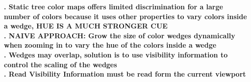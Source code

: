 \documentclass[review,journal]{vgtc}         %
\begin{document}
\textbf{. Static tree color maps offers limited discrimination for a large number of colors because it uses other properties to vary colors inside a wedge, HUE IS A MUCH STRONGER CUE} \\


\textbf{. NAIVE APPROACH: Grow the size of color wedges dynamically when zooming in to vary the hue of the colors inside a wedge} \\


\textbf{. Wedges may overlap, solution is to use visibility information to control the scaling of the wedges} \\


\textbf{. Read Visibility Information must be read form the current viewport} \\

\end{document}
